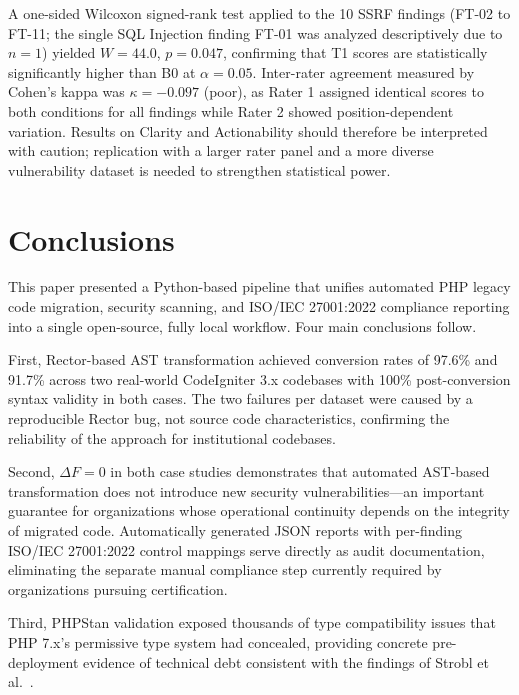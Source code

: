 \documentclass[conference]{IEEEtran}
\begin{document}
A one-sided Wilcoxon signed-rank test \cite{wilcoxon1945individual}
applied to the 10 SSRF findings (FT-02 to FT-11; the single SQL
Injection finding FT-01 was analyzed descriptively due to $n = 1$)
yielded $W = 44.0$, $p = 0.047$, confirming that T1 scores are
statistically significantly higher than B0 at $\alpha = 0.05$.
Inter-rater agreement measured by Cohen's kappa
\cite{cohen1960coefficient} was $\kappa = -0.097$ (poor), as Rater 1
assigned identical scores to both conditions for all findings while
Rater 2 showed position-dependent variation. Results on Clarity and
Actionability should therefore be interpreted with caution;
replication with a larger rater panel and a more diverse vulnerability
dataset is needed to strengthen statistical power.

\section{Conclusions}

This paper presented a Python-based pipeline that unifies
automated PHP legacy code migration, security scanning, and
ISO/IEC 27001:2022 compliance reporting into a single
open-source, fully local workflow. Four main conclusions follow.

First, Rector-based AST transformation achieved conversion rates
of 97.6\% and 91.7\% across two real-world CodeIgniter 3.x
codebases with 100\% post-conversion syntax validity in both
cases. The two failures per dataset were caused by a
reproducible Rector bug, not source code characteristics,
confirming the reliability of the approach for institutional
codebases.

Second, $\Delta F = 0$ in both case studies demonstrates that
automated AST-based transformation does not introduce new
security vulnerabilities---an important guarantee for
organizations whose operational continuity depends on the
integrity of migrated code. Automatically generated JSON
reports with per-finding ISO/IEC 27001:2022 control mappings
serve directly as audit documentation, eliminating the separate
manual compliance step currently required by organizations
pursuing certification.

Third, PHPStan validation exposed thousands of type
compatibility issues that PHP 7.x's permissive type system
had concealed, providing concrete pre-deployment evidence of
technical debt consistent with the findings of Strobl et al.\
\cite{strobl2020automated}.
\end{document}
